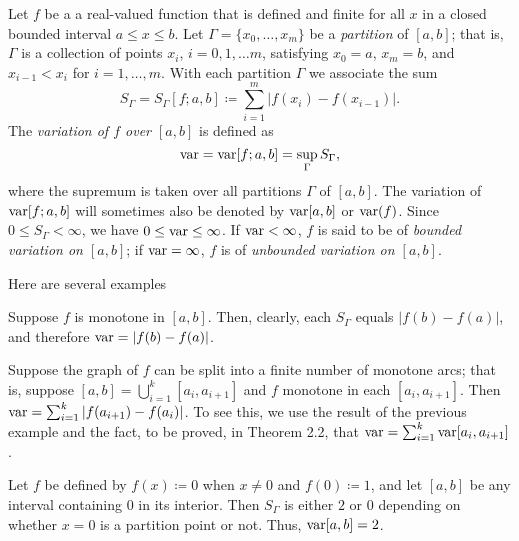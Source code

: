 Let $f$ be a a real-valued function that is defined and finite for all $x$
in a closed bounded interval $a\leq x\leq b$. Let
$\Gamma=\{x_0,\dotsc,x_m\}$ be a \emph{partition} of $[a,b]$; that is,
$\Gamma$ is a collection of points $x_i$, $i=0,1,\dots m$, satisfying
$x_0=a$, $x_m=b$, and $x_{i-1}<x_i$ for $i=1,\dotsc,m$. With each partition
$\Gamma$ we associate the sum
\begin{equation}
\label{eq:variation-sums}
S_\Gamma=S_\Gamma[f;a,b]\coloneqq\sum_{i=1}^m|f(x_i)-f(x_{i-1})|.
\end{equation}
The \emph{variation of $f$ over $[a,b]$} is defined as
\begin{equation}
\label{eq:variation}
\operatorname{var}=\operatorname{var}[f;a,b]=\sup_\Gamma S_\Gamma,
\end{equation}
where the supremum is taken over all partitions $\Gamma$ of $[a,b]$. The
variation of $\operatorname{var}[f;a,b]$ will sometimes also be denoted by $\operatorname{var}[a,b]$ or
$\operatorname{var}(f)$. Since $0\leq S_\Gamma<\infty$, we have $0\leq \operatorname{var}\leq\infty$. If
$\operatorname{var}<\infty$, $f$ is said to be of \emph{bounded variation on $[a,b]$}; if
$\operatorname{var}=\infty$, $f$ is of \emph{unbounded variation on $[a,b]$}.

Here are several examples
\begin{example}
Suppose $f$ is monotone in $[a,b]$. Then, clearly, each $S_\Gamma$ equals
$|f(b)-f(a)|$, and therefore $\operatorname{var}=|f(b)-f(a)|$.
\end{example}
\begin{example}
Suppose the graph of $f$ can be split into a finite number of monotone
arcs; that is, suppose $[a,b]=\bigcup_{i=1}^k[a_i,a_{i+1}]$ and $f$
monotone in each $[a_i,a_{i+1}]$. Then
$\operatorname{var}=\sum_{i=1}^k|f(a_{i+1})-f(a_i)|$. To see this, we use the result of the
previous example and the fact, to be proved, in Theorem 2.2, that
$\operatorname{var}=\sum_{i=1}^k\operatorname{var}[a_i,a_{i+1}]$.
\end{example}
\begin{example}
Let $f$ be defined by $f(x)\coloneqq 0$ when $x\neq 0$ and $f(0)\coloneqq
1$, and let $[a,b]$ be any interval containing $0$ in its interior. Then
$S_\Gamma$ is either $2$ or $0$ depending on whether $x=0$ is a partition
point or not. Thus, $\operatorname{var}[a,b]=2$.
\end{example}

